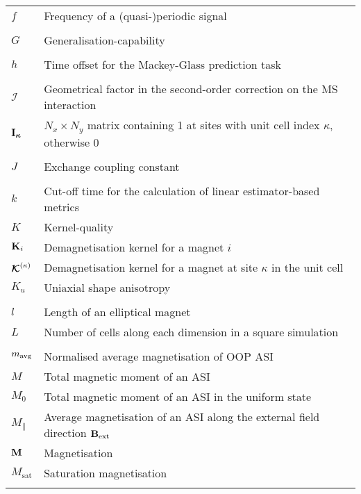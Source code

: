 \begin{longtable}[l]{p{60pt} p{350pt}}
	$f$ & Frequency of a (quasi-)periodic signal \\
	&\\

	$G$ & Generalisation-capability \\
	& \\

	$h$ & Time offset for the Mackey-Glass prediction task \\
	&\\

	$\mathcal{I}$ & Geometrical factor in the second-order correction on the MS interaction \\
	$\boldsymbol{\mathbf{I_\kappa}}$ & $N_x \times N_y$ matrix containing 1 at sites with unit cell index $\kappa$, otherwise 0 \\
	&\\

	$J$ & Exchange coupling constant \\
	&\\

	$k$ & Cut-off time for the calculation of linear estimator-based metrics \\
	$K$ & Kernel-quality \\ %
	$\boldsymbol{\mathbf{K}}_i$ & Demagnetisation kernel for a magnet $i$ \\
	$\boldsymbol{\mathbf{\mathcal{K}}}^{(\kappa)}$ & Demagnetisation kernel for a magnet at site $\kappa$ in the unit cell \\
	$K_u$ & Uniaxial shape anisotropy \\
	&\\

	$l$ & Length of an elliptical magnet \\
	$L$ & Number of cells along each dimension in a square simulation \\
	&\\

	$m_\mathrm{avg}$ & Normalised average magnetisation of OOP ASI \\
	$M$ & Total magnetic moment of an ASI \\
	$M_0$ & Total magnetic moment of an ASI in the uniform state \\
	$M_\parallel$ & Average magnetisation of an ASI along the external field direction $\boldsymbol{\mathbf{B}}_\mathrm{ext}$ \\
	$\boldsymbol{\mathbf{M}}$ & Magnetisation \\
	$M_\mathrm{sat}$ & Saturation magnetisation \\
	&\\


\end{longtable}
